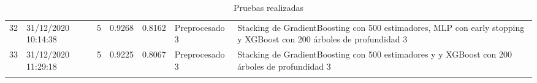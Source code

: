 \documentclass[oneside]{book}
\begin{document}
\begin{longtable}{|c|C{2.1cm}|c|c|c|C{4cm}|C{6cm}|}
\midrule


32 & 31/12/2020 10:14:38 & 5 & 0.9268  & 0.8162 & Preprocesado 3 & Stacking de GradientBoosting con 500 estimadores, MLP con early stopping y XGBoost con 200 árboles de profundidad 3 \\

\midrule

33 & 31/12/2020 11:29:18 & 5 & 0.9225  & 0.8067 & Preprocesado 3 & Stacking de GradientBoosting con 500 estimadores y y XGBoost con 200 árboles de profundidad 3 \\

\bottomrule
\caption{Pruebas realizadas}
\label{tab:pruebas}
\end{longtable}
\end{document}
